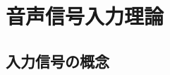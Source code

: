\chapter{音声信号入力理論}

\section{入力信号の概念}

\section{}

\section{}

\section{}

\section{}

\section{}

\section{}